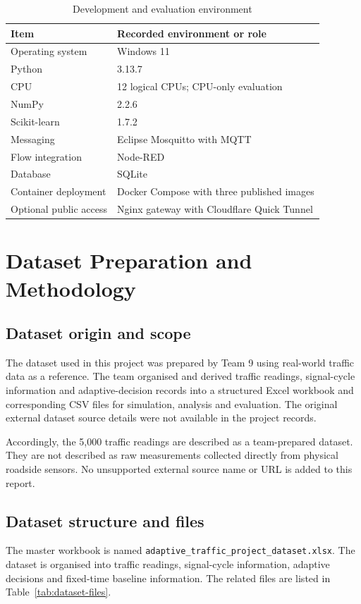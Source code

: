 \documentclass[12pt,a4paper,oneside]{report}
\begin{document}
\begin{table}[htbp]\centering\small
\caption{Development and evaluation environment}\label{tab:environment}
\begin{tabular}{|p{}|p{}|}\hline
\textbf{Item} & \textbf{Recorded environment or role} \\\hline
Operating system & Windows 11 \\\hline
Python & 3.13.7 \\\hline
CPU & 12 logical CPUs; CPU-only evaluation \\\hline
NumPy & 2.2.6 \\\hline
Scikit-learn & 1.7.2 \\\hline
Messaging & Eclipse Mosquitto with MQTT \\\hline
Flow integration & Node-RED \\\hline
Database & SQLite \\\hline
Container deployment & Docker Compose with three published images \\\hline
Optional public access & Nginx gateway with Cloudflare Quick Tunnel \\\hline
\end{tabular}\end{table}

\clearpage
\chapter{Dataset Preparation and Methodology}
\section{Dataset origin and scope}
The dataset used in this project was prepared by Team 9 using real-world traffic data as a reference. The team organised and derived traffic readings, signal-cycle information and adaptive-decision records into a structured Excel workbook and corresponding CSV files for simulation, analysis and evaluation. The original external dataset source details were not available in the project records.

Accordingly, the 5,000 traffic readings are described as a team-prepared dataset. They are not described as raw measurements collected directly from physical roadside sensors. No unsupported external source name or URL is added to this report.

\section{Dataset structure and files}
The master workbook is named \texttt{adaptive\_traffic\_project\_dataset.xlsx}. The dataset is organised into traffic readings, signal-cycle information, adaptive decisions and fixed-time baseline information. The related files are listed in Table~\ref{tab:dataset-files}.
\end{document}
